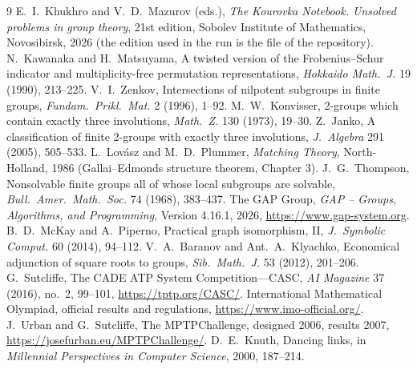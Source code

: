 \begin{thebibliography}{9}
 E.~I.~Khukhro and V.~D.~Mazurov (eds.), \emph{The Kourovka Notebook. Unsolved problems in group
theory}, 21st edition, Sobolev Institute of Mathematics, Novosibirsk, 2026 (the edition used in the run is the
file  of the repository).
 N.~Kawanaka and H.~Matsuyama, A twisted version of the Frobenius--Schur indicator and multiplicity-free
permutation representations, \emph{Hokkaido Math.\ J.} 19 (1990), 213--225.
 V.~I.~Zenkov, Intersections of nilpotent subgroups in finite groups, \emph{Fundam.\ Prikl.\ Mat.}
2 (1996), 1--92.
 M.~W.~Konvisser, 2-groups which contain exactly three involutions, \emph{Math.\ Z.} 130 (1973),
19--30.
 Z.~Janko, A classification of finite 2-groups with exactly three involutions, \emph{J.\ Algebra} 291
(2005), 505--533.
 L.~Lov\'asz and M.~D.~Plummer, \emph{Matching Theory}, North-Holland, 1986 (Gallai--Edmonds structure
theorem, Chapter 3).
 J.~G.~Thompson, Nonsolvable finite groups all of whose local subgroups are solvable, \emph{Bull.\
Amer.\ Math.\ Soc.} 74 (1968), 383--437.
 The GAP Group, \emph{GAP -- Groups, Algorithms, and Programming}, Version 4.16.1, 2026,
\url{https://www.gap-system.org}.
 B.~D.~McKay and A.~Piperno, Practical graph isomorphism, II, \emph{J.\ Symbolic Comput.} 60 (2014),
94--112.
 V.~A.~Baranov and Ant.~A.~Klyachko, Economical adjunction of square roots to groups, \emph{Sib.\ Math.\
J.} 53 (2012), 201--206.
\bibitem{casc} G.~Sutcliffe, The CADE ATP System Competition---CASC, \emph{AI Magazine} 37 (2016), no.~2, 99--101,
\url{https://tptp.org/CASC/}.
\bibitem{imo} International Mathematical Olympiad, official results and regulations,
\url{https://www.imo-official.org/}.
\bibitem{mptpchallenge} J.~Urban and G.~Sutcliffe, The MPTPChallenge, designed 2006, results 2007,
\url{https://josefurban.eu/MPTPChallenge/}.
\bibitem{Knuth} D.~E.~Knuth, Dancing links, in \emph{Millennial Perspectives in Computer Science}, 2000, 187--214.
\end{thebibliography}
